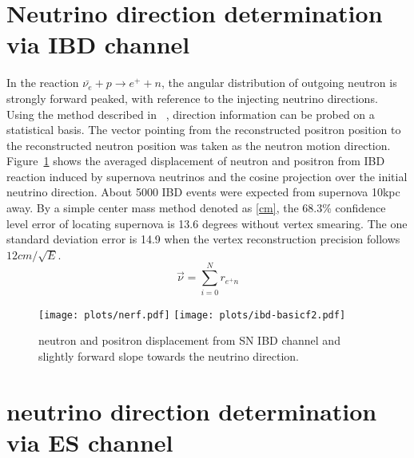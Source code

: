 \documentclass[a4paper,10pt]{cpc-hepnp}
\begin{document}
\section{ Neutrino direction determination via IBD channel}
\label{sec:intro}
In the reaction $\bar{\nu_{e}}+p \rightarrow e^{+}+n$, the
angular distribution of outgoing neutron is strongly forward peaked, with
reference to the injecting neutrino directions. Using the method described in
~\cite{chooz}, direction information can be probed on a  statistical basis.
The vector pointing from the reconstructed positron position to the
reconstructed neutron position was taken as the neutron motion direction.
Figure~\ref{ibd-basicplot} shows the averaged displacement of neutron and
positron from IBD reaction induced by supernova neutrinos and the cosine
projection over the initial neutrino direction. About 5000 IBD events were expected from
supernova 10kpc away. By a simple center mass method denoted as \eqref{cm},
the 68.3\% confidence level error of locating supernova is 13.6 degrees without
vertex smearing. The one standard deviation error is 14.9 when the vertex
reconstruction precision follows $12cm/\sqrt{E}$.
\begin{equation}
\label{cm}
\vec{\nu} = \sum_{i=0}^{N}r_{e^{+}n}
\end{equation}

\begin{figure}[htbp]
\centering %
\texttt{[image: plots/nerf.pdf]}
\hfill
\texttt{[image: plots/ibd-basicf2.pdf]}
\caption{\label{ibd-basicplot} neutron and positron displacement from SN IBD
channel and slightly forward slope towards the neutrino direction.}
\end{figure}
\section{neutrino direction determination via ES channel}
\end{document}
